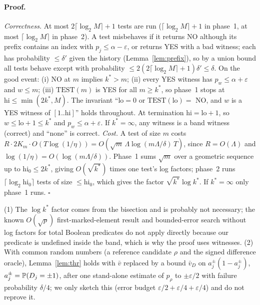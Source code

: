 \paragraph{Proof.} \emph{Correctness.} At most $2\lceil\log_2M\rceil+1$ tests are run ($\lceil\log_2M\rceil+1$ in phase~1, at most $\lceil\log_2M\rceil$ in phase~2). A test misbehaves if it returns NO although its prefix contains an index with $p_j\le\alpha-\varepsilon$, or returns YES with a bad witness; each has probability $\le\delta'$ given the history (Lemma~\ref{lem:prefix}), so by a union bound all tests behave except with probability $\le2(2\lceil\log_2M\rceil+1)\delta'\le\delta$. On the good event: (i) NO at $m$ implies $k^*>m$; (ii) every YES witness has $p_w\le\alpha+\varepsilon$ and $w\le m$; (iii) $\mathrm{TEST}(m)$ is YES for all $m\ge k^*$, so phase~1 stops at $\mathrm{hi}\le\min(2k^*,M)$. The invariant ``$\mathrm{lo}=0$ or $\mathrm{TEST}(\mathrm{lo})=$ NO, and $w$ is a YES witness of $[1..\mathrm{hi}]$'' holds throughout. At termination $\mathrm{hi}=\mathrm{lo}+1$, so $w\le\mathrm{lo}+1\le k^*$ and $p_w\le\alpha+\varepsilon$. If $k^*=\infty$, any witness is a band witness (correct) and ``none'' is correct.
\emph{Cost.} A test of size $m$ costs $R\cdot2K_m\cdot O(T\log(1/\eta))=O(\sqrt m\,\Lambda\log(m\Lambda/\delta)\,T)$, since $R=O(\Lambda)$ and $\log(1/\eta)=O(\log(m\Lambda/\delta))$. Phase~1 sums $\sqrt m$ over a geometric sequence up to $\mathrm{hi}_0\le2k^*$, giving $O(\sqrt{k^*})$ times one test's log factors; phase~2 runs $\lceil\log_2\mathrm{hi}_0\rceil$ tests of size $\le\mathrm{hi}_0$, which gives the factor $\sqrt{k^*}\log k^*$. If $k^*=\infty$ only phase~1 runs. \hfill$\square$

\begin{remark}
(1) The $\log k^*$ factor comes from the bisection and is probably not necessary; the known $O(\sqrt p)$ first-marked-element result and bounded-error search without log factors for total Boolean predicates \citep{hoyer2003bounded} do not apply directly because our predicate is undefined inside the band, which is why the proof uses witnesses. (2) With common random numbers (a reference candidate $\rho$ and the signed difference oracle), Lemma~\ref{lem:thr} holds with $\bar v$ replaced by a bound $\bar v_D$ on $a_j^\pm(1-a_j^\pm)$, $a_j^\pm=\P(D_j=\pm1)$, after one stand-alone estimate of $p_\rho$ to $\pm\varepsilon/2$ with failure probability $\delta/4$; we only sketch this (error budget $\varepsilon/2+\varepsilon/4+\varepsilon/4$) and do not reprove it.
\end{remark}

